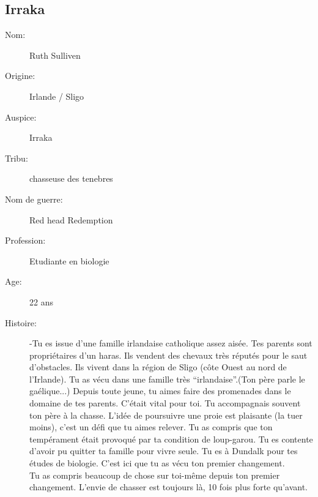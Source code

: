 \documentclass[oneside,12pt]{book}
\begin{document}
\begin{flushleft}
\section{Irraka}
\begin{description}
\item[Nom:]{Ruth Sulliven}
\item[Origine:]{Irlande / Sligo}
\item[Auspice:]{Irraka}
\item[Tribu:]{chasseuse des tenebres}
\item[Nom de guerre:]{Red head Redemption}
\item[Profession:]{Etudiante en biologie}
\item[Age:]{22 ans}
\item[Histoire:]{
-Tu es issue d'une famille irlandaise catholique assez aisée. Tes parents sont propriétaires d'un haras. Ils vendent des chevaux très réputés pour le saut d'obstacles. Ils vivent dans la région de Sligo (côte Ouest au nord de l'Irlande). Tu as vécu dans une famille très “irlandaise”.(Ton père parle le gaélique...)   Depuis toute jeune, tu aimes faire des promenades dans le domaine de tes parents. C'était vital pour toi. Tu accompagnais souvent ton père à la chasse. L'idée de poursuivre une proie est plaisante (la tuer moins), c'est un défi que tu aimes relever. Tu as compris que ton tempérament était provoqué par ta condition de loup-garou. Tu es contente d'avoir pu quitter ta famille pour vivre seule. Tu es à Dundalk pour tes études de biologie. C'est ici que tu as vécu ton premier changement.\\
Tu as compris beaucoup de chose sur toi-même depuis ton premier changement. L'envie de chasser est toujours là, 10 fois plus forte qu'avant. \\

}
\end{description}
\end{flushleft}
\end{document}
